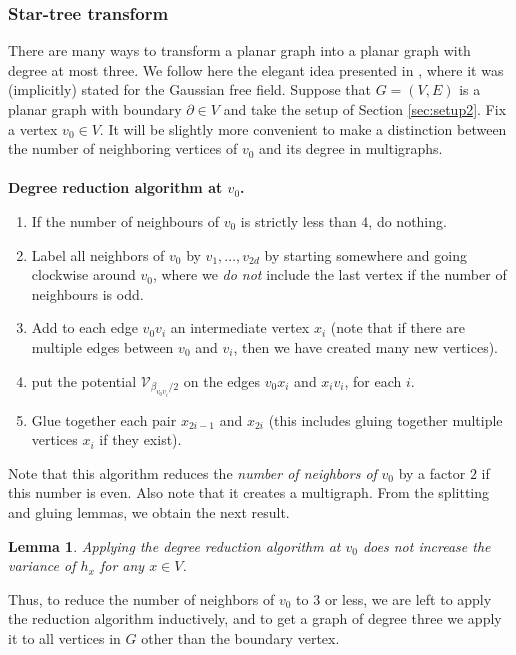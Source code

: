 \documentclass[11pt, reqno]{amsart}
\newtheorem{lemma}[theorem]{Lemma}
\numberwithin{equation}{section}
\theoremstyle{definition}
\theoremstyle{remark}
\renewcommand{\c}[1]{\ensuremath{\mathcal{#1}}}
\begin{document}
\subsubsection*{Star-tree transform}
There are many ways to transform a planar graph into a planar graph with degree at most three.
We follow here the elegant idea presented in \cite{GurNach}, where it was (implicitly) stated for the Gaussian free field. 
 Suppose that $G = (V, E)$ is a planar graph with boundary $\partial \in V$ and take the setup of Section \ref{sec:setup2}. Fix a vertex $v_0 \in V$.
It will be slightly more convenient to make a distinction between the number of neighboring vertices of $v_0$ and its degree in multigraphs.
\\
\\
\noindent \textbf{Degree reduction algorithm at $v_0$.} 
\begin{enumerate}[\hspace{0.4cm}1.]
	\item If the number of neighbours of $v_0$ is strictly less than $4$, do nothing.
	\item Label all neighbors of $v_0$ by $v_1, \ldots, v_{2d}$ by starting somewhere and going clockwise around $v_0$, where we \emph{do not} include the last vertex if the number of neighbours is odd. 
	\item Add to each edge $v_0v_i$ an intermediate vertex $x_i$ (note that if there are multiple edges between $v_0$ and $v_i$, then we have created many new vertices). 
	\item put the potential $\c{V}_{\beta_{v_0v_i} / 2}$ on the edges $v_0x_i$ and $x_iv_i$, for each $i$. 
	\item Glue together each pair $x_{2i - 1}$ and $x_{2i}$ (this includes gluing together multiple vertices $x_i$ if they exist). 
\end{enumerate}

Note that this algorithm reduces the \emph{number of neighbors of} $v_0$ by a factor $2$ if this number is even. 
Also note that it creates a multigraph. 
From the splitting and gluing lemmas, we obtain the next result. 
\begin{lemma}\label{L: star-tree transform}
	Applying the degree reduction algorithm at $v_0$ does not increase the variance of $h_x$ for any $x \in V$. 
\end{lemma}

Thus, to reduce the number of neighbors of $v_0$ to $3$ or less, we are left to apply the reduction algorithm inductively, 
and to get a graph of degree three we apply it to all vertices in $G$ other than the boundary vertex. 
\end{document}
